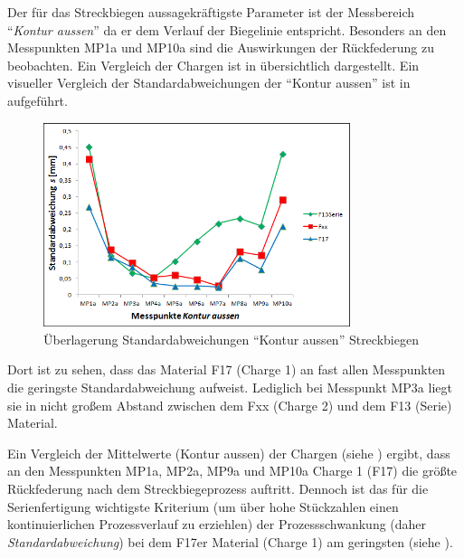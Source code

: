\documentclass[12pt,a4paper,parskip]{scrartcl}
\begin{document}
Der für das Streckbiegen aussagekräftigste Parameter ist der Messbereich "`\emph{Kontur aussen}"' da er dem Verlauf der Biegelinie entspricht. Besonders an den Messpunkten MP1a und MP10a sind die Auswirkungen der Rückfederung zu beobachten. Ein Vergleich der Chargen ist in  übersichtlich dargestellt. Ein visueller Vergleich der Standardabweichungen der "`Kontur aussen"' ist in  aufgeführt.
\begin{figure}[hbtp]
\centering
\includegraphics[width=0.8\textwidth]{standardstreckb}
\caption{Überlagerung Standardabweichungen "`Kontur aussen"' Streckbiegen}
\label{fig:svstb}
\end{figure}
Dort ist zu sehen, dass das Material F17 (Charge 1) an fast allen Messpunkten die geringste Standardabweichung aufweist. Lediglich bei Messpunkt MP3a liegt sie in nicht großem Abstand zwischen dem Fxx (Charge 2) und dem F13 (Serie) Material.

Ein Vergleich der Mittelwerte (Kontur aussen) der Chargen (siehe  ) ergibt, dass an den Messpunkten MP1a, MP2a, MP9a und MP10a  Charge 1 (F17) die größte Rückfederung nach dem Streckbiegeprozess auftritt. Dennoch ist das für die Serienfertigung wichtigste Kriterium (um über hohe Stückzahlen einen kontinuierlichen Prozessverlauf zu erziehlen) der Prozessschwankung (daher \emph{Standardabweichung}) bei dem F17er Material (Charge 1) am geringsten (siehe ).
\end{document}
